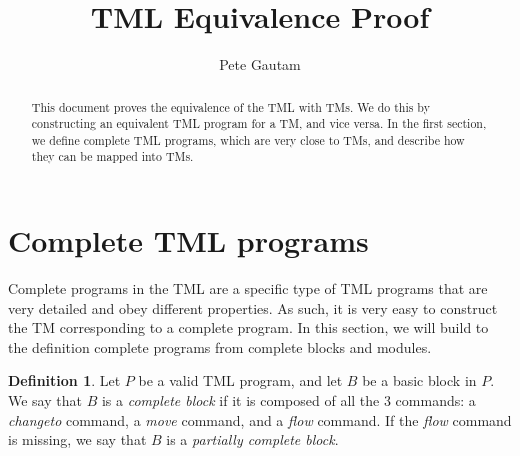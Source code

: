 \documentclass{article}
\title{TML Equivalence Proof}
\author{Pete Gautam}
\theoremstyle{definition}
\newtheorem{definition}[theorem]{Definition}
\begin{document}
    \maketitle

    \begin{abstract}
        This document proves the equivalence of the TML with TMs. We do this by constructing an equivalent TML program for a TM, and vice versa. In the first section, we define complete TML programs, which are very close to TMs, and describe how they can be mapped into TMs. 
    \end{abstract}

    \section{Complete TML programs}
    \noindent Complete programs in the TML are a specific type of TML programs that are very detailed and obey different properties. As such, it is very easy to construct the TM corresponding to a complete program. In this section, we will build to the definition complete programs from complete blocks and modules.
    \begin{definition}
        Let $P$ be a valid TML program, and let $B$ be a basic block in $P$. We say that $B$ is a \emph{complete block} if it is composed of all the 3 commands: a \textit{changeto} command, a \textit{move} command, and a \textit{flow} command. If the \textit{flow} command is missing, we say that $B$ is a \emph{partially complete block}.
    \end{definition}
\end{document}
